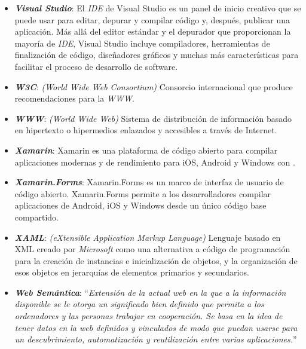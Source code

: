 \begin{itemize}
    \item \textbf{\textit{Visual Studio}}: El \emph{IDE} de Visual Studio 
    es un panel de inicio creativo que se puede usar para editar, 
    depurar y compilar código y, después, publicar una aplicación.
    Más allá del editor estándar y el depurador que proporcionan la 
    mayoría de \emph{IDE}, Visual Studio incluye compiladores, herramientas 
    de finalización de código, diseñadores gráficos y muchas más 
    características para facilitar el proceso de desarrollo de software.

    \item \textbf{\textit{W3C}}: \emph{(World Wide Web Consortium)} Consorcio 
    internacional que produce recomendaciones para la \emph{WWW}.

    \item \textbf{\textit{WWW}}: \emph{(World Wide Web)} Sistema de distribución 
    de información basado en hipertexto o hipermedios enlazados y accesibles 
    a través de Internet. 

    \item \textbf{\textit{Xamarin}}: Xamarin es una plataforma de código 
    abierto para compilar aplicaciones modernas y de rendimiento para iOS, 
    Android y Windows con \dotnet.

    \item \textbf{\textit{Xamarin.Forms}}: Xamarin.Forms es un marco de 
    interfaz de usuario de código abierto. Xamarin.Forms permite a los 
    desarrolladores compilar aplicaciones de Android, iOS y Windows 
    desde un único código base compartido.

    \item \textbf{\textit{XAML}}: \emph{(eXtensible Application Markup 
    Language)} Lenguaje basado en XML creado por \emph{Microsoft} como una 
    alternativa a código de programación para la creación de instancias 
    e inicialización de objetos, y la organización de esos objetos en 
    jerarquías de elementos primarios y secundarios.

    \item \textbf{\textit{Web Semántica}}: ``\textit{Extensión de la actual 
    web en la que a la información disponible se le otorga un significado 
    bien definido que permita a los ordenadores y las personas trabajar en 
    cooperación. Se basa en la idea de tener datos en la web definidos y 
    vinculados de modo que puedan usarse para un descubrimiento, 
    automatización y reutilización entre varias aplicaciones.}''

\end{itemize}
